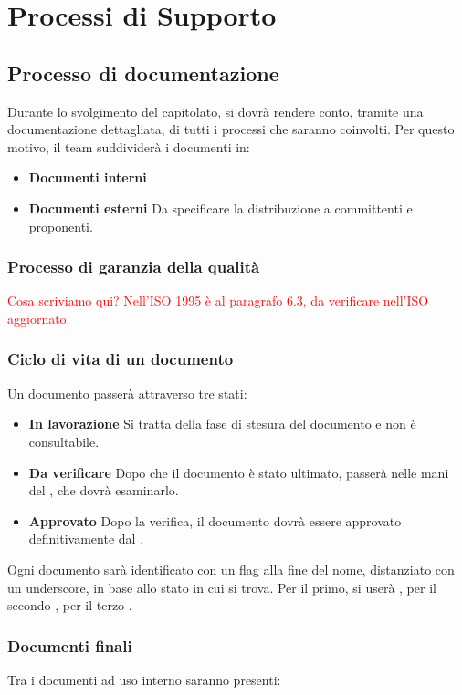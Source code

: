 \newpage
\section{Processi di Supporto}
\subsection{Processo di documentazione}
Durante lo svolgimento del capitolato, si dovrà rendere conto, tramite una documentazione dettagliata, di tutti i processi che saranno coinvolti. 
Per questo motivo, il team suddividerà i documenti in:
\begin{itemize}
	\item \textbf{Documenti interni}
	\item \textbf{Documenti esterni}
	Da specificare la distribuzione a committenti e proponenti.
\end{itemize}
\subsubsection{Processo di garanzia della qualità}
\textcolor{red}{Cosa scriviamo qui? Nell'ISO 1995 è al paragrafo 6.3, da verificare nell'ISO aggiornato.}

\subsubsection{Ciclo di vita di un documento}
Un documento passerà attraverso tre stati:
\begin{itemize}
	\item \textbf{In lavorazione}
	Si tratta della fase di stesura del documento e non è consultabile.
	\item \textbf{Da verificare}
	Dopo che il documento è stato ultimato, passerà nelle mani del \ver, che dovrà esaminarlo.
	\item \textbf{Approvato}
	Dopo la verifica, il documento dovrà essere approvato definitivamente dal \RdP.
\end{itemize}
Ogni documento sarà identificato con un flag alla fine del nome, distanziato con un underscore, in base allo stato in cui si trova. 
Per il primo, si userà \emph{}, per il secondo \emph{}, per il terzo \emph{}.
\subsubsection{Documenti finali}
Tra i documenti ad uso interno saranno presenti:
